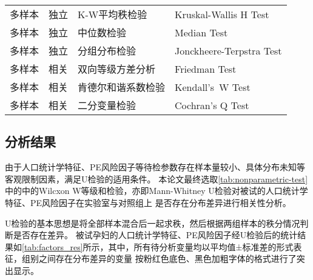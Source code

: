 \begin{center}
\begin{longtable}{m{1.8cm}<{\centering}m{2cm}<{\centering}m{5cm}<{\centering}m{5cm}<{\centering}}
         多样本   & 独立    & K-W平均秩检验 & Kruskal-Wallis H Test \\
         多样本   & 独立    & 中位数检验 & Median Test \\
         多样本   & 独立    & 分组分布检验 & Jonckheere-Terpstra Test \\
         多样本   & 相关    & 双向等级方差分析 & Friedman Test \\
         多样本   & 相关    & 肯德尔和谐系数检验 & Kendall's W Test \\
         多样本   & 相关    & 二分变量检验 & Cochran's Q Test \\
    \end{longtable}
\end{center}
\vspace{-0.8cm}

\subsection{分析结果}
由于人口统计学特征、PE风险因子等待检参数存在样本量较小、具体分布未知等客观限制因素，满足U检验的适用条件。
本论文最终选取\autoref{tab:nonparametric-test}中的中的Wilcxon W等级和检验，亦即Mann-Whitney U检验对被试的人口统计学特征、PE风险因子在实验室与对照组上
是否存在分布差异进行相关性分析。

U检验的基本思想是将全部样本混合后一起求秩，然后根据两组样本的秩分情况判断是否存在差异。
被试孕妇的人口统计学特征、PE风险因子经U检验后的统计结果如\autoref{tab:factors_res}所示，其中，所有待分析变量均以平均值±标准差的形式表征，组别之间存在分布差异的变量
按粉红色底色、黑色加粗字体的格式进行了突出显示。

